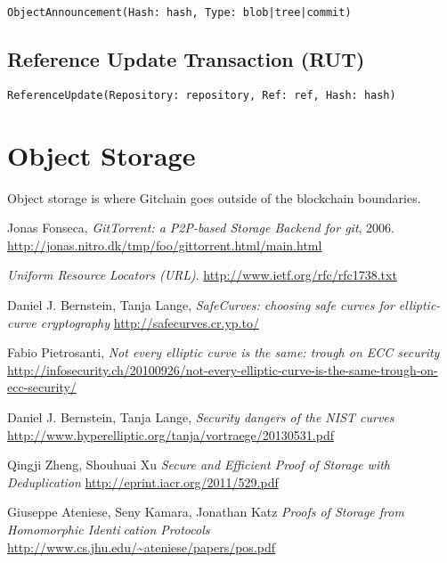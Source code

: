 \documentclass[a4paper]{article}
\begin{document}
\begin{verbatim}
ObjectAnnouncement(Hash: hash, Type: blob|tree|commit)
\end{verbatim}

\subsection{Reference Update Transaction (RUT)}

\begin{verbatim}
ReferenceUpdate(Repository: repository, Ref: ref, Hash: hash)
\end{verbatim}

\section{Object Storage}

Object storage is where Gitchain goes outside of the blockchain boundaries.

\begin{thebibliography}{9}

  Jonas Fonseca,
  \emph{GitTorrent: a P2P-based Storage Backend for git}, 2006.
  \url{http://jonas.nitro.dk/tmp/foo/gittorrent.html/main.html}

  \emph{Uniform Resource Locators (URL)}.
  \url{http://www.ietf.org/rfc/rfc1738.txt}

  Daniel J. Bernstein, Tanja Lange,
  \emph{SafeCurves: choosing safe curves for elliptic-curve cryptography}
  \url{http://safecurves.cr.yp.to/}

  Fabio Pietrosanti,
  \emph{Not every elliptic curve is the same: trough on ECC security}
  \url{http://infosecurity.ch/20100926/not-every-elliptic-curve-is-the-same-trough-on-ecc-security/}

  Daniel J. Bernstein, Tanja Lange,
  \emph{Security dangers of the NIST curves}
  \url{http://www.hyperelliptic.org/tanja/vortraege/20130531.pdf}

  Qingji Zheng, Shouhuai Xu
  \emph{Secure and Efficient Proof of Storage with Deduplication}
  \url{http://eprint.iacr.org/2011/529.pdf}

  Giuseppe Ateniese, Seny Kamara, Jonathan Katz
  \emph{Proofs of Storage from Homomorphic Identication Protocols}
  \url{http://www.cs.jhu.edu/~ateniese/papers/pos.pdf}

\end{thebibliography}
\end{document}
